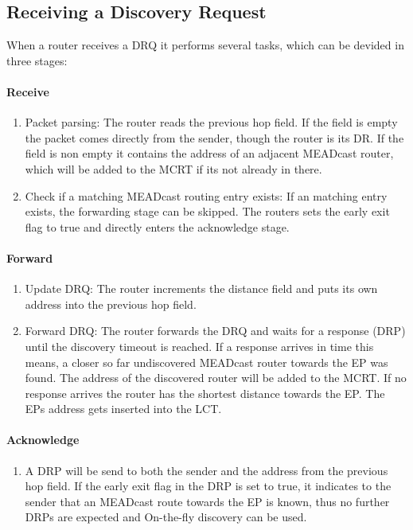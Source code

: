 \subsection{Receiving a Discovery Request} %
\label{sub:Receiving a Discovery Request}

When a router receives a DRQ it performs several tasks, which can be devided in
three stages:

\paragraph{Receive} %
\label{par:Receive}
\begin{enumerate}
    \item Packet parsing:
          The router reads the previous hop field.
          If the field is empty the packet comes directly from the sender,
          though the router is its DR.
          If the field is non empty it contains the address of an adjacent
          MEADcast router, which will be added to the MCRT if its not already in
          there.
    \item Check if a matching MEADcast routing entry exists:
          If an matching entry exists, the forwarding stage can be skipped.
          The routers sets the early exit flag to true and directly enters the
          acknowledge stage.
\end{enumerate}

\paragraph{Forward} %
\label{par:Forward}
\begin{enumerate}
    \item Update DRQ: The router increments the distance field and puts its own
          address into the previous hop field.
    \item Forward DRQ: The router forwards the DRQ and waits for a response
          (DRP) until the discovery timeout is reached.
          If a response arrives in time this means, a closer so far undiscovered
          MEADcast router towards the EP was found.
          The address of the discovered router will be added to the MCRT.
          If no response arrives the router has the shortest distance towards
          the EP.
          The EPs address gets inserted into the LCT.
\end{enumerate}

\paragraph{Acknowledge} %
\label{par:Acknowledge}
\begin{enumerate}
    \item A DRP will be send to both the sender and the address
          from the previous hop field.
          If the early exit flag in the DRP is set to true, it indicates to the
          sender that an MEADcast route towards the EP is known, thus no further
          DRPs are expected and On-the-fly discovery can be used.
\end{enumerate}

